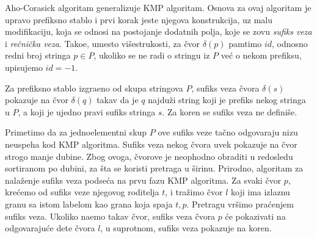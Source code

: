 Aho-Corasick algoritam generalizuje KMP algoritam. Osnova za ovaj algoritam je upravo prefiksno stablo i prvi korak jeste njegova konstrukcija, uz malu modifikaciju, koja se odnosi na postojanje dodatnih polja, koje se zovu \textit{sufiks veza} i \textit{re\v cni\v cka veza}. Tako\dj e, umesto vi\v sestrukosti, za \v cvor $\delta(p)$ pamtimo $id$, odnosno redni broj stringa $p \in P$, ukoliko se ne radi o stringu iz $P$ ve\' c o nekom prefiksu, upisujemo $id = -1$. 

\noindent
\begin{minipage}[l]{\textwidth}

\end{minipage}

\noindent
\begin{minipage}[l]{\textwidth}

\end{minipage}

\begin{dfn}
Za prefiksno stablo izgra\dj eno od skupa stringova $P$, sufiks veza \v cvora $\delta(s)$ pokazuje na \v cvor $\delta(q)$ takav da je $q$ najdu\v zi string koji je prefiks nekog stringa u $P$, a koji je ujedno pravi sufiks stringa $s$. Za koren se sufiks veza ne defini\v se.
\end{dfn}

Primetimo da za jednoelementni skup $P$ ove sufiks veze ta\v cno odgovaraju nizu neuspeha kod KMP algoritma. Sufiks veza nekog \v cvora uvek pokazuje na \v cvor strogo manje dubine. Zbog ovoga, \v cvorove je neophodno obraditi u redosledu sortiranom po dubini, za \v sta se koristi pretraga u \v sirinu. Prirodno, algoritam za nala\v zenje sufiks veza podse\' ca na prvu fazu KMP algoritma. Za svaki \v cvor $p$, kre\' cemo od sufiks veze njegovog roditelja $t$, i tra\v zimo \v cvor $l$ koji ima izlaznu granu sa istom labelom kao grana koja spaja $t,p$. Pretragu vr\v simo pra\' cenjem sufiks veza. Ukoliko na\dj emo takav \v cvor, sufiks veza \v cvora $p$ \' ce pokazivati na odgovaraju\' ce dete \v cvora $l$, u suprotnom, sufiks veza pokazuje na koren.

\noindent
\begin{minipage}[l]{\textwidth}

\end{minipage}

